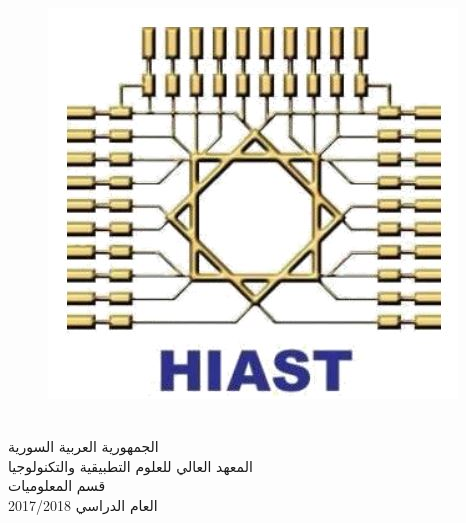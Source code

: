 

	\thispagestyle{empty}
	
	\newfontfamily{}
	\newfontfamily{}
	
	{
		\begin{figure}
			\hfill
			\includegraphics[width=0.9\linewidth]{images/HIAST_logo.JPG}
		\end{figure}
			
		\coverfont
		\begin{spacing}{1.6}
			\ \\
			الجمهورية العربية السورية \\
			المعهد العالي للعلوم التطبيقية والتكنولوجيا \\
			قسم المعلوميات \\
			العام الدراسي 2017/2018  \\
		\end{spacing}
	}
	
